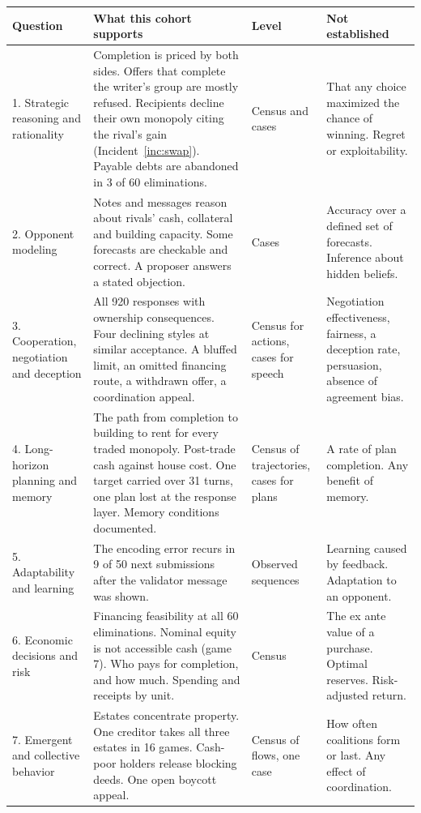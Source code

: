 \begin{table}[p]
\centering\footnotesize
\renewcommand{\arraystretch}{1.12}
\begin{tabularx}{\linewidth}{@{}L{2.55cm}YL{1.75cm}L{3.5cm}@{}}
\toprule
Question & What this cohort supports & Level & Not established\\
. Strategic reasoning and rationality & Completion is priced by both sides. Offers that complete the writer's group are mostly refused. Recipients decline their own monopoly citing the rival's gain (Incident~\ref{inc:swap}). Payable debts are abandoned in 3 of 60 eliminations. & Census and cases & That any choice maximized the chance of winning. Regret or exploitability.\\
2. Opponent modeling & Notes and messages reason about rivals' cash, collateral and building capacity. Some forecasts are checkable and correct. A proposer answers a stated objection. & Cases & Accuracy over a defined set of forecasts. Inference about hidden beliefs.\\
3. Cooperation, negotiation and deception & All 920 responses with ownership consequences. Four declining styles at similar acceptance. A bluffed limit, an omitted financing route, a withdrawn offer, a coordination appeal. & Census for actions, cases for speech & Negotiation effectiveness, fairness, a deception rate, persuasion, absence of agreement bias.\\
4. Long-horizon planning and memory & The path from completion to building to rent for every traded monopoly. Post-trade cash against house cost. One target carried over 31 turns, one plan lost at the response layer. Memory conditions documented. & Census of trajectories, cases for plans & A rate of plan completion. Any benefit of memory.\\
5. Adaptability and learning & The encoding error recurs in 9 of 50 next submissions after the validator message was shown. & Observed sequences & Learning caused by feedback. Adaptation to an opponent.\\
6. Economic decisions and risk & Financing feasibility at all 60 eliminations. Nominal equity is not accessible cash (game 7). Who pays for completion, and how much. Spending and receipts by unit. & Census & The ex ante value of a purchase. Optimal reserves. Risk-adjusted return.\\
7. Emergent and collective behavior & Estates concentrate property. One creditor takes all three estates in 16 games. Cash-poor holders release blocking deeds. One open boycott appeal. & Census of flows, one case & How often coalitions form or last. Any effect of coordination.\\

\end{tabularx}
\end{table}
